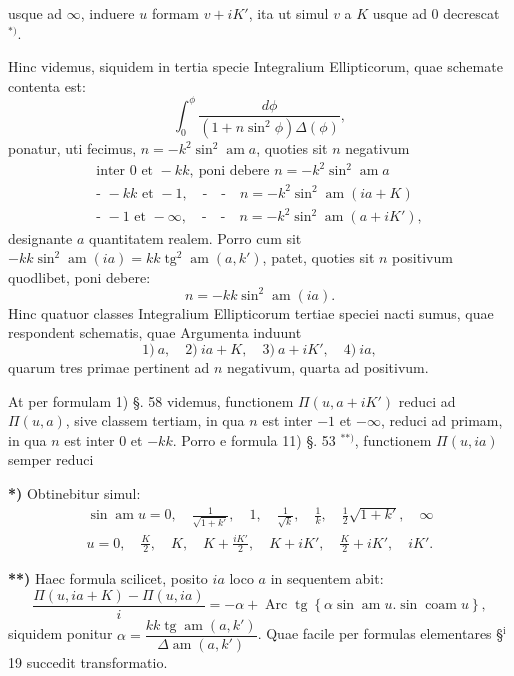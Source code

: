 \documentclass{article}
\begin{document}
usque ad $\infty$, induere $u$ formam $v+iK'$, ita ut simul $v$ a $K$ usque ad 0 decrescat ${}^{*)}$.

Hinc videmus, siquidem in tertia specie Integralium Ellipticorum, quae schemate contenta est:
\[
\int_{0}^{\phi}\frac{d\phi}{(1+n\sin^{2}\phi)\Delta(\phi)},
\]
ponatur, uti fecimus, $n=-k^{2}\sin^{2}\operatorname{am}a$, quoties sit $n$ negativum
\[
\begin{gathered}
\text{inter }0\text{ et }-kk,\ \text{poni debere }n=-k^{2}\sin^{2}\operatorname{am}a\\[1ex]
\text{- }-kk\text{ et }-1,\quad\text{-}\quad\text{-}\quad n=-k^{2}\sin^{2}\operatorname{am}(ia+K)\\[1ex]
\text{- }-1\text{ et }-\infty,\quad\text{-}\quad\text{-}\quad n=-k^{2}\sin^{2}\operatorname{am}(a+iK'),
\end{gathered}
\]
designante $a$ quantitatem realem. Porro cum sit $-kk\sin^{2}\operatorname{am}(ia)=kk\operatorname{tg}^{2}\operatorname{am}(a,k')$, patet, quoties sit $n$ positivum quodlibet, poni debere:
\[
n=-kk\sin^{2}\operatorname{am}(ia).
\]
Hinc quatuor classes Integralium Ellipticorum tertiae speciei nacti sumus, quae respondent schematis, quae Argumenta induunt
\[
\text{1)}\ a,\quad\text{2)}\ ia+K,\quad\text{3)}\ a+iK',\quad\text{4)}\ ia,
\]
quarum tres primae pertinent ad $n$ negativum, quarta ad positivum.

At per formulam 1) §. 58 videmus, functionem $\Pi(u,a+iK')$ reduci ad $\Pi(u,a)$, sive classem tertiam, in qua $n$ est inter $-1$ et $-\infty$, reduci ad primam, in qua $n$ est inter 0 et $-kk$. Porro e formula 11) §. 53 ${}^{**)}$, functionem $\Pi(u,ia)$ semper reduci

\textbf{*)} Obtinebitur simul:
\[
\begin{gathered}
\sin\operatorname{am}u=0,\quad\frac{1}{\sqrt{1+k'}},\quad 1,\quad\frac{1}{\sqrt{k}},\quad\frac{1}{k},\quad\frac{1}{2}\sqrt{1+k'},\quad\infty\\[1.5ex]
u=0,\quad\frac{K}{2},\quad K,\quad K+\frac{iK'}{2},\quad K+iK',\quad\frac{K}{2}+iK',\quad iK'.
\end{gathered}
\]

\textbf{**)} Haec formula scilicet, posito $ia$ loco $a$ in sequentem abit:
\[
\frac{\Pi(u,ia+K)-\Pi(u,ia)}{i}=-\alpha+\operatorname{Arc}\operatorname{tg}\left\{\alpha\sin\operatorname{am}u.\sin\operatorname{coam}u\right\},
\]
siquidem ponitur $\alpha=\dfrac{kk\operatorname{tg}\operatorname{am}(a,k')}{\Delta\operatorname{am}(a,k')}$. Quae facile per formulas elementares §$^{\mathrm{i}}$ 19 succedit transformatio.
\end{document}
